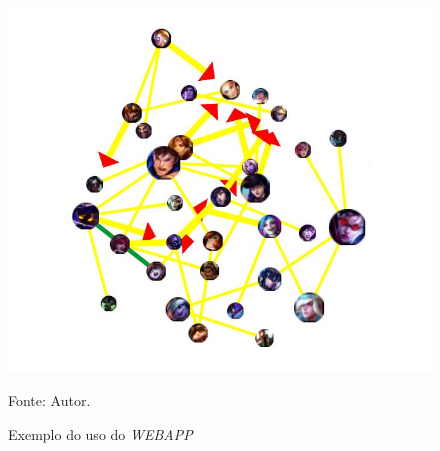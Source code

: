 \begin{figure}[h]
	\caption{Exemplo do uso do \textit{WEBAPP}}
	\begin{center}
		\includegraphics[width=12cm]{imagens/webservice.jpg}
	\end{center}
	\small{Fonte: Autor.}
	\label{fig:webapp}
\end{figure}
